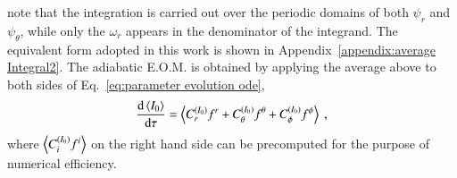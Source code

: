 \documentclass[aps,prx,reprint,superscriptaddress,nofootinbib,longbibliography]{revtex4-1}
\begin{document}
note that the integration is carried out over the periodic domains of both $\psi_{r}$ and $\psi_{\theta}$, while only the $\omega_{r}$ appears in the denominator of the integrand. The equivalent form adopted in this work is shown in Appendix~\ref{appendix:average Integral2}. The adiabatic E.O.M. is obtained by applying the average above to both sides of Eq.~\eqref{eq:parameter evolution ode}, 
\begin{equation}
    \dv{\expval{I_{0}}}{\tau}=\expval{C^{(I_{0})}_rf^{r}+C^{(I_{0})}_{\theta}f^{\theta}+C^{(I_{0})}_{\phi}f^{\phi}}\ ,
    \label{eq:secular ode}
\end{equation}
where  $\expval{C^{(I_{0})}_if^i}$ on the right hand side can be precomputed for the purpose of numerical efficiency.

\end{document}
